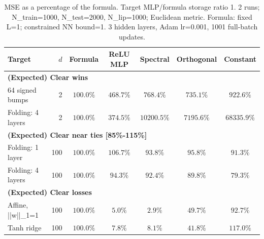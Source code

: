 \documentclass{article}
\begin{document}
\clearpage
\begin{table}[t]
\centering
\scriptsize
\setlength{\tabcolsep}{3pt}
\caption{MSE as a percentage of the formula. Target MLP/formula storage ratio 1. 2 runs; N\_train=1000, N\_test=2000, N\_lip=1000; Euclidean metric. Formula: fixed L=1; constrained NN bound=1. 3 hidden layers, Adam lr=0.001, 1001 full-batch updates.}
\begin{tabular}{lrccccc}
\hline
Target & $d$ & Formula & ReLU MLP & Spectral & Orthogonal & Constant \\
\hline
\multicolumn{7}{l}{\textbf{(Expected) Clear wins}} \\
64 signed bumps & 2 & $100.0\%$ & $468.7\%$ & $768.4\%$ & $735.1\%$ & $922.6\%$ \\
Folding: 4 layers & 2 & $100.0\%$ & $374.5\%$ & $10200.5\%$ & $7195.6\%$ & $68335.9\%$ \\
\hline
\multicolumn{7}{l}{\textbf{(Expected) Clear near ties [85\%-115\%]}} \\
Folding: 1 layer & 100 & $100.0\%$ & $106.7\%$ & $93.8\%$ & $95.8\%$ & $91.3\%$ \\
Folding: 4 layers & 100 & $100.0\%$ & $94.3\%$ & $92.4\%$ & $89.8\%$ & $79.3\%$ \\
\hline
\multicolumn{7}{l}{\textbf{(Expected) Clear losses}} \\
Affine, ||w||\_1=1 & 100 & $100.0\%$ & $5.0\%$ & $2.9\%$ & $49.7\%$ & $92.7\%$ \\
Tanh ridge & 100 & $100.0\%$ & $7.8\%$ & $8.1\%$ & $41.8\%$ & $117.0\%$ \\
\hline
\end{tabular}
\end{table}
\clearpage
\end{document}
